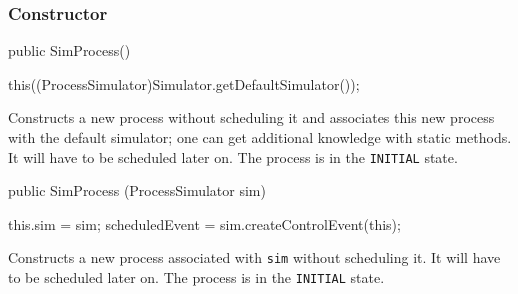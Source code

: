 \subsubsection* {Constructor}
\begin{code}

   public SimProcess() \begin{hide} {
      this((ProcessSimulator)Simulator.getDefaultSimulator());
   }\end{hide}
\end{code}
 \begin{tabb}  Constructs a new process without scheduling it
  and associates this new process with the default simulator; one
  can get additional knowledge with
  static methods.
   It will have to be scheduled later on.
   The process is in the \texttt{INITIAL} state.
 \end{tabb}
\begin{code}

   public SimProcess (ProcessSimulator sim) \begin{hide} {
      this.sim = sim;
      scheduledEvent = sim.createControlEvent(this);
   }\end{hide}
\end{code}
 \begin{tabb}  Constructs a new process associated with \texttt{sim}
  without scheduling it. It will have to be scheduled later on.
   The process is in the \texttt{INITIAL} state.
 \end{tabb}
 \begin{htmlonly}
\end{htmlonly}


